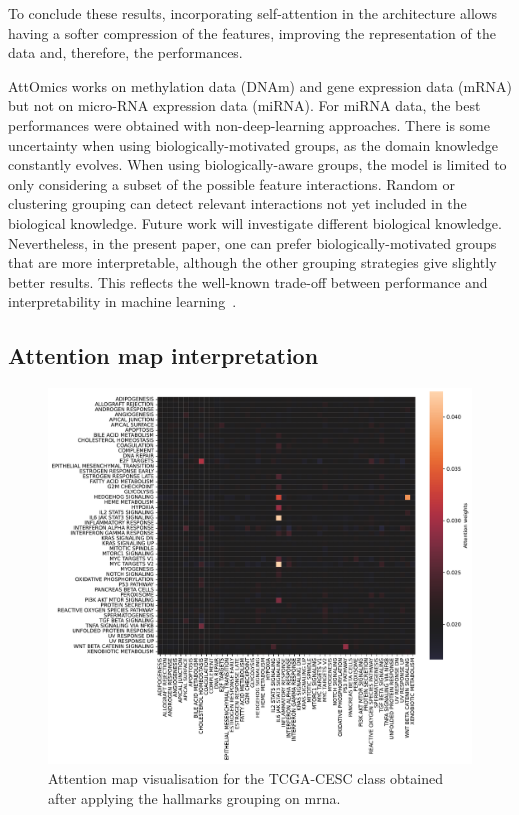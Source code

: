 \documentclass[../main.tex]{subfiles}
\begin{document}
		To conclude these results, incorporating self-attention in the architecture allows having a softer compression of the features, improving the representation of the data and, therefore, the performances.

		AttOmics works on methylation data (DNAm) and gene expression data (mRNA) but not on micro-RNA expression data (miRNA).
		For miRNA data, the best performances were obtained with non-deep-learning approaches.
		There is some uncertainty when using biologically-motivated groups, as the domain knowledge constantly evolves.
		When using biologically-aware groups, the model is limited to only considering a subset of the possible feature interactions.
		Random or clustering grouping can detect relevant interactions not yet included in the biological knowledge.
		Future work will investigate different biological knowledge.
		Nevertheless, in the present paper, one can prefer biologically-motivated groups that are more interpretable, although the other grouping strategies give slightly better results.
		This reflects the well-known trade-off between performance and interpretability in machine learning~\cite{Linardatos2021_ExplainableAI}.

	\subsection{Attention map interpretation}

		\begin{figure}[htbp]
			\centering
			\includegraphics[width=\linewidth]{Beaude.168.fig.4.pdf}
			\caption{Attention map visualisation for the TCGA-CESC class obtained after applying the hallmarks grouping on \gls{mrna}.}\label{fig:att_map_viz}
		\end{figure}
\end{document}
